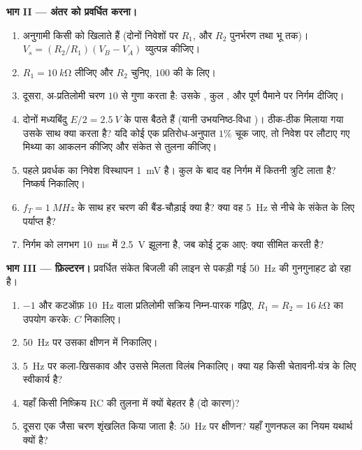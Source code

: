 \begin{problem}
\medskip
\noindent\textbf{भाग II --- अंतर को प्रवर्धित करना।}
\begin{enumerate}[resume]
  \item अनुगामी किसी  को खिलाते हैं (दोनों निवेशों पर $R_1$,
        और $R_2$ पुनर्भरण तथा भू तक)। $V_s =
        (R_2/R_1)(V_B - V_A)$ व्युत्पन्न कीजिए।
  \item $R_1 = \qty{10}{k\ohm}$ लीजिए और $R_2$ चुनिए, $100$ की  के लिए।
  \item दूसरा, अ-प्रतिलोमी चरण $10$ से गुणा करता है: उसके , कुल
        , और पूर्ण पैमाने पर निर्गम दीजिए।
  \item दोनों मध्यबिंदु $E/2 = \qty{2.5}{V}$ के पास बैठते हैं (यानी
        उभयनिष्ठ-विधा )। ठीक-ठीक मिलाया गया  उसके
        साथ क्या करता है? यदि कोई एक प्रतिरोध-अनुपात $1\%$ चूक जाए, तो
        निवेश पर लौटाए गए मिथ्या  का आकलन कीजिए और संकेत से तुलना कीजिए।
  \item पहले प्रवर्धक का निवेश विस्थापन \qty{1}{mV} है। कुल  के बाद
        वह निर्गम में कितनी त्रुटि लाता है? निष्कर्ष निकालिए।
  \item $f_T = \qty{1}{MHz}$ के साथ हर चरण की बैंड-चौड़ाई क्या है?
        क्या वह \qty{5}{Hz} से नीचे के संकेत के लिए पर्याप्त है?
  \item निर्गम को लगभग \qty{10}{ms} में \qty{2.5}{V} झूलना है, जब कोई ट्रक
        आए: क्या  सीमित करती है?
\end{enumerate}

\medskip
\noindent\textbf{भाग III --- फ़िल्टरन।}
प्रवर्धित संकेत बिजली की लाइन से पकड़ी गई \qty{50}{Hz} की गुनगुनाहट ढो रहा
है।
\begin{enumerate}[resume]
  \item {} $-1$ और कटऑफ़ \qty{10}{Hz} वाला प्रतिलोमी सक्रिय निम्न-पारक
        गढ़िए, $R_1 = R_2 = \qty{16}{k\ohm}$ का उपयोग करके: $C$ निकालिए।
  \item \qty{50}{Hz} पर उसका क्षीणन  में निकालिए।
  \item \qty{5}{Hz} पर कला-खिसकाव और उससे मिलता विलंब निकालिए। क्या यह
        किसी चेतावनी-यंत्र के लिए स्वीकार्य है?
  \item यहाँ किसी निष्क्रिय RC की तुलना में  क्यों बेहतर है
        (दो कारण)?
  \item दूसरा एक जैसा चरण शृंखलित किया जाता है: \qty{50}{Hz} पर क्षीणन?
        यहाँ गुणनफल का नियम यथार्थ क्यों है?
\end{enumerate}


\end{problem}
